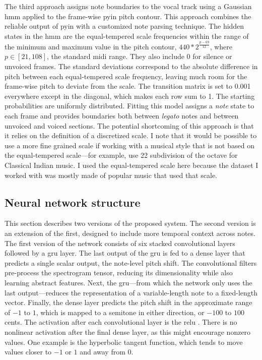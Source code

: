 The third approach assigns note boundaries to the vocal track using a Gaussian \gls{hmm} applied to the frame-wise \gls{pyin} pitch contour. This approach combines the reliable output of \gls{pyin} with a customized note parsing technique. The hidden states in the \gls{hmm} are the equal-tempered scale frequencies within the range of the minimum and maximum value in the pitch contour, $440 * 2^{\frac{p - 69}{12}}$, where $p \in [21, 108]$, the standard \gls{midi} range. They also include 0 for silence or unvoiced frames. The standard deviations correspond to the absolute difference in pitch between each equal-tempered scale frequency, leaving much room for the frame-wise pitch to deviate from the scale. The transition matrix is set to 0.001 everywhere except in the diagonal, which makes each row sum to 1. The starting probabilities are uniformly distributed. Fitting this model assigns a \textit{note} state to each frame and provides boundaries both between \textit{legato} notes and between unvoiced and voiced sections. The potential shortcoming of this approach is that it relies on the definition of a discretized scale. I note that it would be possible to use a more fine grained scale if working with a musical style that is not based on the equal-tempered scale---for example, use 22 subdivision of the octave for Classical Indian music. I used the equal-tempered scale here because the dataset I worked with was mostly made of popular music that used that scale.  

\subsection{Neural network structure}
This section describes two versions of the proposed system. The second version is an extension of the first, designed to include more temporal context across notes. The first version of the network consists of six stacked convolutional layers followed by a \gls{gru} layer. The last output of the \gls{gru} is fed to a dense layer that predicts a single scalar output, the note-level pitch shift. The convolutional filters pre-process the spectrogram tensor, reducing its dimensionality while also learning abstract features. Next, the \gls{gru}---from which the network only uses the last output---reduces the representation of a variable-length note to a fixed-length vector. Finally, the dense layer predicts the pitch shift in the approximate range of $-1$ to $1$, which is mapped to a semitone in either direction, or $-100$ to $100$ cents. The activation after each convolutional layer is the \gls{relu} \cite{he2015delving}. There is no nonlinear activation after the final dense layer, as this might encourage nonzero values. One example is the hyperbolic tangent function, which tends to move values closer to $-1$ or $1$ and away from 0. 


